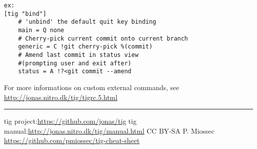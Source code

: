 \documentclass[10pt,landscape]{article}
\begin{document}
\begin{multicols}{3}
\begin{verbatim}
ex:
[tig "bind"]
    # 'unbind' the default quit key binding
    main = Q none
    # Cherry-pick current commit onto current branch
    generic = C !git cherry-pick %(commit)
    # Amend last commit in status view
    #(prompting user and exit after)
    status = A !?<git commit --amend
\end{verbatim}

For more informations on custom external commands, see \url{http://jonas.nitro.dk/tig/tigrc.5.html}


\rule{0.3\linewidth}{0.25pt}
\scriptsize

tig project:\url{https://github.com/jonas/tig}
\linebreak
tig manual:\url{http://jonas.nitro.dk/tig/manual.html}
\linebreak
CC BY-SA P. Miossec \url{https://github.com/pmiossec/tig-cheat-sheet}

\end{multicols}
\end{document}
